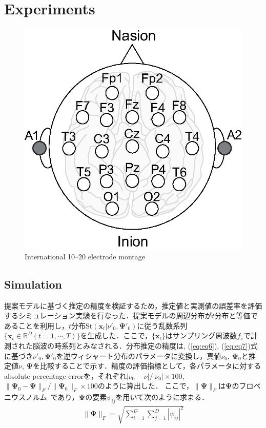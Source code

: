 \documentclass[journal]{IEEEtran}
\begin{document}




\section{Experiments}
\begin{figure}[!t]
\centering
\includegraphics[width=0.6\hsize]{figure/electrodes.eps}
\caption{International 10--20 electrode montage}
\label{fig:electrodes}
\end{figure}

\subsection{Simulation}
提案モデルに基づく推定の精度を検証するため，推定値と実測値の誤差率を評価するシミュレーション実験を行なった．提案モデルの周辺分布が$t$分布と等価であることを利用し，$t$分布$\mathrm{St}(\mathbf{x}_t|\nu'_0, \mathbf{\Psi}'_0)$に従う乱数系列$\{\mathbf{x}_t \in \mathbb{R}^D (t = 1, \cdots, T)\}$を生成した．ここで，$\{\mathbf{x}_t \}$はサンプリング周波数$f_s$で計測された脳波の時系列とみなされる．分布推定の精度は, (\ref{eq:eq6}), (\ref{eq:eq7})式に基づき$\nu'_0,\mathbf{\Psi}'_0$を逆ウィシャート分布のパラメータに変換し，真値$\nu_0$, $\mathbf{\Psi}_0$と推定値$\nu$, $\mathbf{\Psi}$を比較することで示す．精度の評価指標として，各パラメータに対する absolute percentage errorを，それぞれ${|\nu_0 -\nu|}/{|\nu_0|}\times100$, ${\|\mathbf{\Psi}_0-\mathbf{\Psi}\|_F}/{\|\mathbf{\Psi}_0\|_F}\times100$のように算出した．
ここで，$\|\mathbf{\Psi}\|_F$は$\mathbf{\Psi}$のフロベニウスノルム~\cite{GeneHowardGolub2013}であり，$\mathbf{\Psi}$の要素${\psi_{ij}}$を用いて次のように求まる．
\begin{align}%
	\|\mathbf{\Psi}\|_F=\sqrt{\sum_{i=1}^D \sum_{j=1}^D |{\psi_{ij}}|^2}
\end{align}
\end{document}
